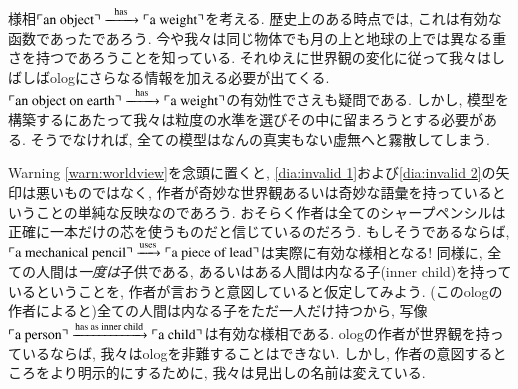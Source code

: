 \begin{warning}
様相$\fakebox{an object}\Too{\tn{has}}\fakebox{a weight}$を考える. 歴史上のある時点では, これは有効な函数であったであろう. 今や我々は同じ物体でも月の上と地球の上では異なる重さを持つであろうことを知っている. それゆえに世界観の変化に従って我々はしばしばologにさらなる情報を加える必要が出てくる. $\fakebox{an object on earth}\Too{\tn{has}}\fakebox{a weight}$の有効性でさえも疑問である. しかし, 模型を構築するにあたって我々は粒度の水準を選びその中に留まろうとする必要がある. そうでなければ, 全ての模型はなんの真実もない虚無へと霧散してしまう.

\end{warning}

\begin{remark}


Warning \ref{warn:worldview}を念頭に置くと, \eqref{dia:invalid 1}および\eqref{dia:invalid 2}の矢印は悪いものではなく, 作者が奇妙な世界観あるいは奇妙な語彙を持っているということの単純な反映なのであろう. おそらく作者は全てのシャープペンシルは正確に一本だけの芯を使うものだと信じているのだろう. もしそうであるならば, $\fakebox{a mechanical pencil}\To{\tn{uses}}\fakebox{a piece of lead}$は実際に有効な様相となる! 同様に, 全ての人間は\emph{一度は}子供である, あるいはある人間は内なる子(inner child)を持っているということを, 作者が言おうと意図していると仮定してみよう. (このologの作者によると)全ての人間は内なる子をただ一人だけ持つから, 写像$\fakebox{a person}\To{\tn{has as inner child}}\fakebox{a child}$は有効な様相である. ologの作者が世界観を持っているならば, 我々はologを非難することはできない. しかし, 作者の意図するところをより明示的にするために, 我々は見出しの名前は変えている.

\end{remark}

